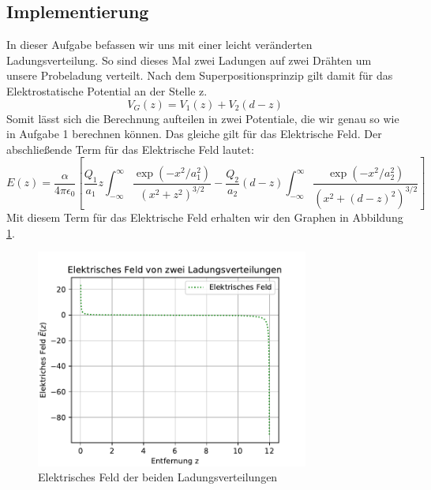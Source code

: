 \documentclass[12pt,a4paper]{article}
\begin{document}
\subsection{Implementierung}
In dieser Aufgabe befassen wir uns mit einer leicht veränderten Ladungsverteilung. So sind dieses Mal zwei Ladungen auf zwei Drähten um unsere Probeladung verteilt. Nach dem Superpositionsprinzip gilt damit für das Elektrostatische Potential an der Stelle z.
\begin{equation}
	V_G(z) = V_1(z) + V_2(d-z)
\end{equation}
Somit lässt sich die Berechnung aufteilen in zwei Potentiale, die wir genau so wie in Aufgabe 1 berechnen können. Das gleiche gilt für das Elektrische Feld. Der abschließende Term für das Elektrische Feld lautet:
\begin{equation}
	E(z) = \frac{\alpha}{4\pi\epsilon_0}\left[\frac{Q_1}{a_1}z\int_{-\infty}^{\infty}\frac{\exp(-x^2/a_1^2)}{(x^2 + z^2)^{3/2}}
	-\frac{Q_2}{a_2}(d-z)\int_{-\infty}^{\infty}\frac{\exp(-x^2/a_2^2)}{(x^2 + (d-z)^2)^{3/2}}\right]
\end{equation}
Mit diesem Term für das Elektrische Feld erhalten wir den Graphen in Abbildung \ref{f:e_field_3}.
\begin{figure}[htbp]
\includegraphics[width=0.8\textwidth]{aufgabe3_1.pdf}
\caption[Elektrisches Feld]{Elektrisches Feld der beiden Ladungsverteilungen}
\label{f:e_field_3}
\end{figure}
\end{document}
